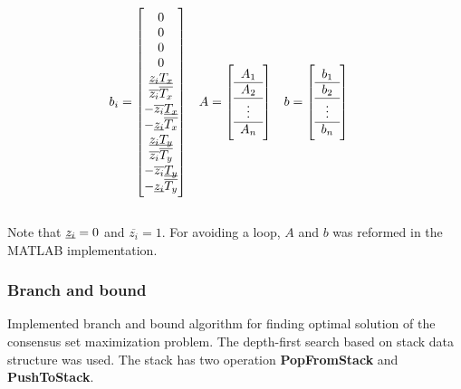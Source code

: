 \documentclass[paper=a4, fontsize=11pt]{scrartcl} %
\numberwithin{equation}{section} %
\numberwithin{figure}{section} %
\numberwithin{table}{section} %
\newcommand{\funcname}[1]{\textbf{#1}}
\begin{document}
\begin{align*}
b_{i} &= 
\begin{bmatrix}
	0 \\ 0 \\ 0 \\ 0 \\ 
        \underbar{$z_{i}$}\underbar{$T_{x}$} \\
        \overline{z_{i}} \overline{T_{x}} \\
        -\overline{z_{i}} \underbar{$T_{x}$} \\
        -\underbar{$z_{i}$} \overline{T_{x}} \\
        \underbar{$z_{i}$}\underbar{$T_{y}$} \\
        \overline{z_{i}} \overline{T_{y}} \\
        -\overline{z_{i}} \underbar{$T_{y}$} \\
        -\underbar{$z_{i}$} \overline{T_{y}}
\end{bmatrix} &
A &=  
\left[ \begin{array}{c}
	A_{1} \\
	\hline 
	A_{2} \\
	\hline
	\vdots \\
	\hline
	A_{n} 
\end{array} \right] &
b &= 
\left[ \begin{array}{c}
	b_{1} \\
	\hline 
	b_{2} \\
	\hline
	\vdots \\
	\hline
	b_{n} 
\end{array} \right]
\end{align*} \\

Note that $\underbar{$z_{i}$} = 0$ and $\overline{z_{i}} = 1$. For avoiding a loop, $A$ and $b$ was reformed in the MATLAB implementation.


\subsubsection{Branch and bound}

Implemented branch and bound algorithm for finding optimal solution of the consensus set maximization problem. The depth-first search based on stack data structure was used. The stack has two operation \funcname{PopFromStack} and \funcname{PushToStack}. \\
\end{document}
